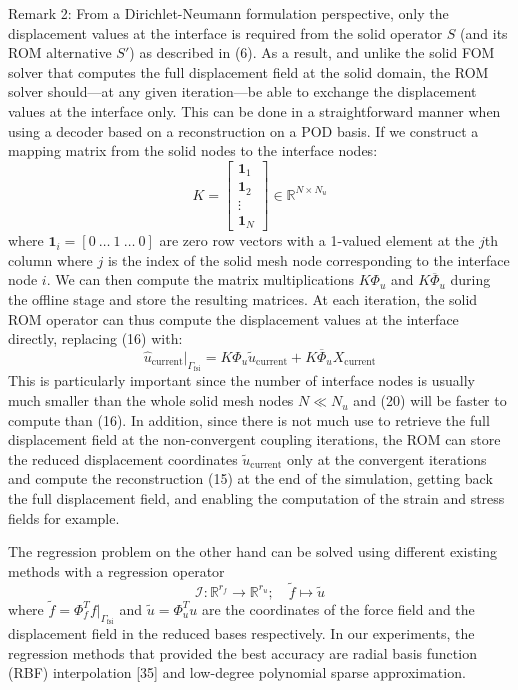 \documentclass[11pt]{article}
\begin{document}
Remark 2: From a Dirichlet-Neumann formulation perspective, only the displacement values at the interface is required from the solid operator $S$ (and its ROM alternative $S'$) as described in (6). As a result, and unlike the solid FOM solver that computes the full displacement field at the solid domain, the ROM solver should---at any given iteration---be able to exchange the displacement values at the interface only. This can be done in a straightforward manner when using a decoder based on a reconstruction on a POD basis. If we construct a mapping matrix from the solid nodes to the interface nodes:
\begin{equation}
\tag{19}
K =
\begin{bmatrix}
\mathbf{1}_{1}\\
\mathbf{1}_{2}\\
\vdots\\
\mathbf{1}_{N}
\end{bmatrix}
\in \mathbb{R}^{N \times N_u}
\end{equation}
where $\mathbf{1}_i = [0 \ \ldots \ 1 \ \ldots \ 0]$ are zero row vectors with a 1-valued element at the $j$th column where $j$ is the index of the solid mesh node corresponding to the interface node $i$. We can then compute the matrix multiplications $K\Phi_u$ and $K\overline{\Phi}_u$ during the offline stage and store the resulting matrices. At each iteration, the solid ROM operator can thus compute the displacement values at the interface directly, replacing (16) with:
\begin{equation}
\tag{20}
\hat{u}_{\mathrm{current}}|_{\Gamma_{\mathrm{fsi}}}
=
K\Phi_u \tilde{u}_{\mathrm{current}}
+
K\overline{\Phi}_u X_{\mathrm{current}}
\end{equation}
This is particularly important since the number of interface nodes is usually much smaller than the whole solid mesh nodes $N \ll N_u$ and (20) will be faster to compute than (16). In addition, since there is not much use to retrieve the full displacement field at the non-convergent coupling iterations, the ROM can store the reduced displacement coordinates $\tilde{u}_{\mathrm{current}}$ only at the convergent iterations and compute the reconstruction (15) at the end of the simulation, getting back the full displacement field, and enabling the computation of the strain and stress fields for example.

The regression problem on the other hand can be solved using different existing methods with a regression operator
\begin{equation}
\tag{21}
\mathcal{I} : \mathbb{R}^{r_f} \to \mathbb{R}^{r_u};\quad \tilde{f} \mapsto \tilde{u}
\end{equation}
where $\tilde{f} = \Phi_f^{T}f|_{\Gamma_{\mathrm{fsi}}}$ and $\tilde{u} = \Phi_u^{T}u$ are the coordinates of the force field and the displacement field in the reduced bases respectively. In our experiments, the regression methods that provided the best accuracy are radial basis function (RBF) interpolation [35] and low-degree polynomial sparse approximation.
\end{document}

